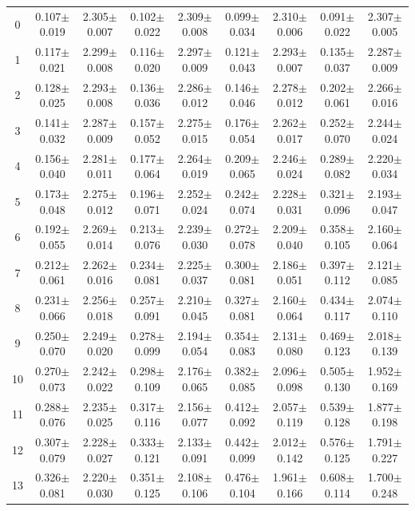 \begin{table}[H]
{\begin{tabular}{c cc cc cc cc}
0 & 0.107$\pm$0.019 & 2.305$\pm$0.007 & 0.102$\pm$0.022 & 2.309$\pm$0.008 & 0.099$\pm$0.034 & 2.310$\pm$0.006 & 0.091$\pm$0.022 & 2.307$\pm$0.005 \\
1 & 0.117$\pm$0.021 & 2.299$\pm$0.008 & 0.116$\pm$0.020 & 2.297$\pm$0.009 & 0.121$\pm$0.043 & 2.293$\pm$0.007 & 0.135$\pm$0.037 & 2.287$\pm$0.009 \\
2 & 0.128$\pm$0.025 & 2.293$\pm$0.008 & 0.136$\pm$0.036 & 2.286$\pm$0.012 & 0.146$\pm$0.046 & 2.278$\pm$0.012 & 0.202$\pm$0.061 & 2.266$\pm$0.016 \\
3 & 0.141$\pm$0.032 & 2.287$\pm$0.009 & 0.157$\pm$0.052 & 2.275$\pm$0.015 & 0.176$\pm$0.054 & 2.262$\pm$0.017 & 0.252$\pm$0.070 & 2.244$\pm$0.024 \\
4 & 0.156$\pm$0.040 & 2.281$\pm$0.011 & 0.177$\pm$0.064 & 2.264$\pm$0.019 & 0.209$\pm$0.065 & 2.246$\pm$0.024 & 0.289$\pm$0.082 & 2.220$\pm$0.034 \\
5 & 0.173$\pm$0.048 & 2.275$\pm$0.012 & 0.196$\pm$0.071 & 2.252$\pm$0.024 & 0.242$\pm$0.074 & 2.228$\pm$0.031 & 0.321$\pm$0.096 & 2.193$\pm$0.047 \\
6 & 0.192$\pm$0.055 & 2.269$\pm$0.014 & 0.213$\pm$0.076 & 2.239$\pm$0.030 & 0.272$\pm$0.078 & 2.209$\pm$0.040 & 0.358$\pm$0.105 & 2.160$\pm$0.064 \\
7 & 0.212$\pm$0.061 & 2.262$\pm$0.016 & 0.234$\pm$0.081 & 2.225$\pm$0.037 & 0.300$\pm$0.081 & 2.186$\pm$0.051 & 0.397$\pm$0.112 & 2.121$\pm$0.085 \\
8 & 0.231$\pm$0.066 & 2.256$\pm$0.018 & 0.257$\pm$0.091 & 2.210$\pm$0.045 & 0.327$\pm$0.081 & 2.160$\pm$0.064 & 0.434$\pm$0.117 & 2.074$\pm$0.110 \\
9 & 0.250$\pm$0.070 & 2.249$\pm$0.020 & 0.278$\pm$0.099 & 2.194$\pm$0.054 & 0.354$\pm$0.083 & 2.131$\pm$0.080 & 0.469$\pm$0.123 & 2.018$\pm$0.139 \\
10 & 0.270$\pm$0.073 & 2.242$\pm$0.022 & 0.298$\pm$0.109 & 2.176$\pm$0.065 & 0.382$\pm$0.085 & 2.096$\pm$0.098 & 0.505$\pm$0.130 & 1.952$\pm$0.169 \\
11 & 0.288$\pm$0.076 & 2.235$\pm$0.025 & 0.317$\pm$0.116 & 2.156$\pm$0.077 & 0.412$\pm$0.092 & 2.057$\pm$0.119 & 0.539$\pm$0.128 & 1.877$\pm$0.198 \\
12 & 0.307$\pm$0.079 & 2.228$\pm$0.027 & 0.333$\pm$0.121 & 2.133$\pm$0.091 & 0.442$\pm$0.099 & 2.012$\pm$0.142 & 0.576$\pm$0.125 & 1.791$\pm$0.227 \\
13 & 0.326$\pm$0.081 & 2.220$\pm$0.030 & 0.351$\pm$0.125 & 2.108$\pm$0.106 & 0.476$\pm$0.104 & 1.961$\pm$0.166 & 0.608$\pm$0.114 & 1.700$\pm$0.248 \\

\end{tabular}}
\end{table}
